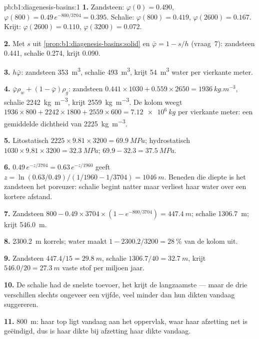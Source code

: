 \begin{solution}{pb:b1:diagenesis-basins:1}
\textbf{1.} Zandsteen: $\varphi(0) = \num{0.490}$, $\varphi(800) =
0.49\,e^{-800/3704} = \num{0.395}$. Schalie: $\varphi(800) = \num{0.419}$,
$\varphi(2600) = \num{0.167}$. Krijt: $\varphi(2600) = \num{0.110}$,
$\varphi(3200) = \num{0.072}$.

\textbf{2.} Met $s$ uit \cref{prop:b1:diagenesis-basins:solid} en $\bar\varphi
= 1 - s/h$ (vraag~7): zandsteen \num{0.441}, schalie \num{0.274}, krijt
\num{0.090}.

\textbf{3.} $h\bar\varphi$: zandsteen \qty{353}{m^3}, schalie \qty{493}{m^3}, krijt
\qty{54}{m^3} water per vierkante meter.

\textbf{4.} $\bar\varphi\rho_w + (1 - \bar\varphi)\rho_g$: zandsteen
$0.441\times1030 + 0.559\times2650 = \qty{1936}{kg.m^{-3}}$, schalie
\qty{2242}{kg.m^{-3}}, krijt \qty{2559}{kg.m^{-3}}. De kolom weegt
$1936\times800 + 2242\times1800 + 2559\times600 = \qty{7.12e6}{kg}$ per vierkante
meter: een gemiddelde dichtheid van \qty{2225}{kg.m^{-3}}.

\textbf{5.} Litostatisch $2225\times9.81\times3200 = \qty{69.9}{MPa}$; hydrostatisch
$1030\times9.81\times3200 = \qty{32.3}{MPa}$; 
$69.9 - 32.3 = \qty{37.5}{MPa}$.

\textbf{6.} $0.49\,e^{-z/3704} = 0.63\,e^{-z/1960}$ geeft $z = \ln(0.63/0.49)
/(1/1960 - 1/3704) = \qty{1046}{m}$. Beneden die diepte is het zandsteen het poreuzer:
schalie begint natter maar verliest haar water over een kortere afstand.

\textbf{7.} Zandsteen $800 - 0.49\times3704\times(1 - e^{-800/3704}) =
\qty{447.4}{m}$; schalie \qty{1306.7}{m}; krijt \qty{546.0}{m}.

\textbf{8.} \qty{2300.2}{m} korrels; water maakt $1 - 2300.2/3200 =
\qty{28}{\%}$ van de kolom uit.

\textbf{9.} Zandsteen $447.4/15 = \qty{29.8}{m}$, schalie $1306.7/40 =
\qty{32.7}{m}$, krijt $546.0/20 = \qty{27.3}{m}$ vaste stof per miljoen jaar.

\textbf{10.} De schalie had de snelste toevoer, het krijt de langzaamste --- maar de
drie verschillen slechts ongeveer een vijfde, veel minder dan hun dikten vandaag
suggereren.

\textbf{11.} \qty{800}{m}: haar top ligt vandaag aan het oppervlak, waar haar afzetting
net is geëindigd, dus is haar dikte bij afzetting haar dikte vandaag.


\end{solution}
